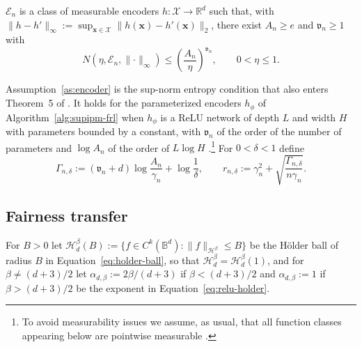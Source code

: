 \begin{assumption}
\label{as:encoder}
$\mathcal{E}_n$ is a class of measurable encoders $h:\mathcal{X}\to\mathbb{R}^d$ such that, with $\lVert h-h'\rVert_\infty:=\sup_{\mathbf{x}\in\mathcal{X}}\lVert h(\mathbf{x})-h'(\mathbf{x})\rVert_2$, there exist $A_n\ge e$ and $\mathfrak{v}_n\ge1$ with
\begin{equation}
  N(\eta,\mathcal{E}_n,\lVert\cdot\rVert_\infty)
  \le\left(\frac{A_n}{\eta}\right)^{\mathfrak{v}_n},
  \qquad 0<\eta\le1 .
  \label{eq:encoder-entropy}
\end{equation}
\end{assumption}

Assumption~\ref{as:encoder} is the sup-norm entropy condition that also enters Theorem~5 of \citet{kong2025fair}.  It holds for the parameterized encoders $h_{\phi}$ of Algorithm~\ref{alg:supipm-frl} when $h_{\phi}$ is a ReLU network of depth $L$ and width $H$ with parameters bounded by a constant, with $\mathfrak{v}_n$ of the order of the number of parameters and $\log A_n$ of the order of $L\log H$ \citep[e.g.][Lemma~5]{schmidthieber2020nonparametric}.\footnote{To avoid measurability issues we assume, as usual, that all function classes appearing below are pointwise measurable \citep[Section~2.3.3]{vaart1996weak}.}  For $0<\delta<1$ define
\begin{equation}
  \Gamma_{n,\delta}
  :=(\mathfrak{v}_n+d)\log\frac{A_n}{\gamma_n}+\log\frac{1}{\delta},
  \qquad
  r_{n,\delta}
  :=\gamma_n^2+\sqrt{\frac{\Gamma_{n,\delta}}{n\gamma_n}} .
  \label{eq:rate}
\end{equation}

\subsection{Fairness transfer}
\label{sec:theory-transfer}

For $B>0$ let $\mathcal{H}^{\beta}_d(B):=\{f\in C^{k}(\mathbb{B}^d):\lVert f\rVert_{\mathcal{H}^{\beta}}\le B\}$ be the H\"older ball of radius $B$ in Equation~\ref{eq:holder-ball}, so that $\mathcal{H}^{\beta}_d=\mathcal{H}^{\beta}_d(1)$, and for $\beta\ne(d+3)/2$ let $\alpha_{d,\beta}:=2\beta/(d+3)$ if $\beta<(d+3)/2$ and $\alpha_{d,\beta}:=1$ if $\beta>(d+3)/2$ be the exponent in Equation~\ref{eq:relu-holder}.

